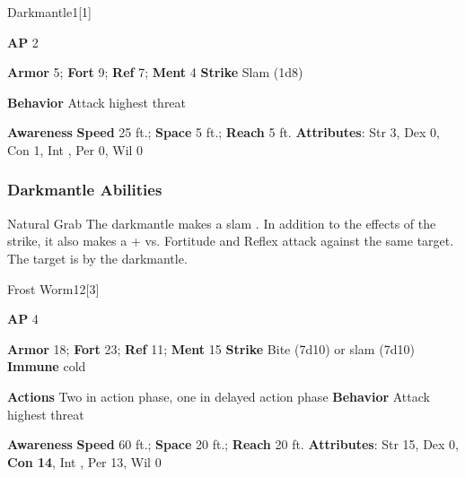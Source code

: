 \begin{monsection}{Darkmantle}{1}[1]
\vspace{-1em}\vspace{-1em}
\begin{spellcontent}
\begin{spelltargetinginfo}
{\textbf{AP} 2}

\pari \textbf{Armor} 5;
\textbf{Fort} 9;
\textbf{Ref} 7;
\textbf{Ment} 4
\pari \textbf{Strike} Slam  (1d8)



\pari \textbf{Behavior} Attack highest threat
\end{spelltargetinginfo}
\end{spellcontent}

\begin{monsterfooter}
\pari \textbf{Awareness} 
\pari \textbf{Speed} 25 ft.;
\textbf{Space} 5 ft.;
\textbf{Reach} 5 ft.
\pari \textbf{Attributes}:
Str 3,
Dex 0,
Con 1,
Int ,
Per 0,
Wil 0
\end{monsterfooter}
\end{monsection}


\subsubsection{Darkmantle Abilities}

\begin{ability}{Natural Grab}
The darkmantle makes a slam .
In addition to the effects of the strike, it also makes a + vs. Fortitude and Reflex attack against the same target.
\hit The target is  by the darkmantle.
\end{ability}






\begin{monsection}{Frost Worm}{12}[3]
\vspace{-1em}\vspace{-1em}
\begin{spellcontent}
\begin{spelltargetinginfo}
{\textbf{AP} 4}

\pari \textbf{Armor} 18;
\textbf{Fort} 23;
\textbf{Ref} 11;
\textbf{Ment} 15
\pari \textbf{Strike} Bite  (7d10) or slam  (7d10)
\pari \textbf{Immune} cold

\pari \textbf{Actions} Two in action phase, one in delayed action phase
\pari \textbf{Behavior} Attack highest threat
\end{spelltargetinginfo}
\end{spellcontent}

\begin{monsterfooter}
\pari \textbf{Awareness} 
\pari \textbf{Speed} 60 ft.;
\textbf{Space} 20 ft.;
\textbf{Reach} 20 ft.
\pari \textbf{Attributes}:
Str 15,
Dex 0,
\textbf{Con 14},
Int ,
Per 13,
Wil 0
\end{monsterfooter}
\end{monsection}


